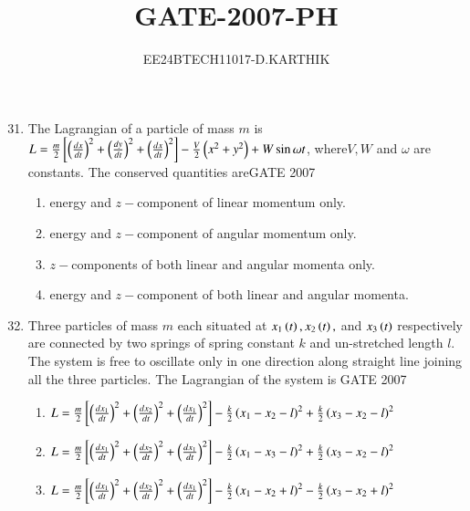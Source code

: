 \documentclass[journal]{IEEEtran}
\begin{document}

\vspace{3cm}

\title{GATE-2007-PH}
\author{EE24BTECH11017-D.KARTHIK}
\maketitle

\renewcommand{\thefigure}{\theenumi}
\renewcommand{\thetable}{\theenumi}
\setlength{\intextsep}{10pt}


\renewcommand{\thetable}{\theenumi}

\begin{enumerate}
\setcounter{enumi}{30}  
    \item The Lagrangian of a particle of mass $m$ is $L = \frac{m}{2}{}\left[\left(\frac{dx}{dt}\right)^2 +\left(\frac{dy}{dt}\right)^2 +\left(\frac{dx}{dt}\right)^2\right]-\frac{V}{2}\left(x^2+y^2\right)+W\sin{\omega t}$, where$V,W$ and $\omega$ are constants. The conserved quantities are\hfill{GATE 2007} \begin{enumerate}
    \item energy and $z-$component of linear momentum only.
    \item energy and $z-$component of angular momentum only. 
    \item $z-$components of both linear and angular momenta only.
    \item energy and $z-$component of both linear and angular momenta.
\end{enumerate}
\item Three particles of mass $m$ each situated at $x_1\left(t\right), x_2\left(t\right),$ and $x_3\left(t\right)$ respectively are connected by two springs of spring constant $k$ and un-stretched length $l$. The system is free to oscillate only in one direction along straight line joining all the three particles. The Lagrangian of the system is \hfill{GATE 2007}
\begin{enumerate}
    \item $L = \frac{m}{2}{}\left[\left(\frac{dx_1}{dt}\right)^2 +\left(\frac{dx_2}{dt}\right)^2 +\left(\frac{dx_1}{dt}\right)^2\right]-\frac{k}{2}\left(x_1-x_2-l\right)^2 + \frac{k}{2}\left(x_3 - x_2 - l\right)^2$
     \item $L = \frac{m}{2}{}\left[\left(\frac{dx_1}{dt}\right)^2 +\left(\frac{dx_2}{dt}\right)^2 +\left(\frac{dx_1}{dt}\right)^2\right]-\frac{k}{2}\left(x_1-x_3-l\right)^2 + \frac{k}{2}\left(x_3 - x_2 - l\right)^2$
      \item $L = \frac{m}{2}{}\left[\left(\frac{dx_1}{dt}\right)^2 +\left(\frac{dx_2}{dt}\right)^2 +\left(\frac{dx_1}{dt}\right)^2\right]-\frac{k}{2}\left(x_1-x_2+l\right)^2 - \frac{k}{2}\left(x_3 - x_2 + l\right)^2$

\end{enumerate}
\end{enumerate}
\end{document}
